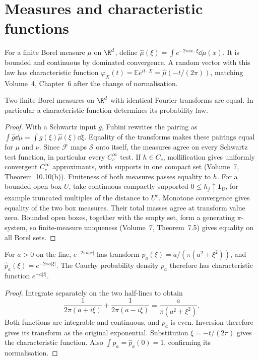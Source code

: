 \section{Measures and characteristic functions}

For a finite Borel measure $\mu$ on $\R^d$, define $\hat\mu(\xi)=\int e^{-2\pi ix\cdot\xi}\dd\mu(x)$. It is bounded and continuous by dominated convergence. A random vector with this law has characteristic function
$\varphi_X(t)=\mathbb E e^{it\cdot X}=\hat\mu(-t/(2\pi))$,
matching Volume~4, Chapter~6 after the change of normalisation.

\begin{theorem}\label{thm:measuniq}
Two finite Borel measures on $\R^d$ with identical Fourier transforms are equal. In particular a characteristic function determines its probability law.
\end{theorem}
\begin{proof}
With a Schwartz input $g$, Fubini rewrites the pairing as $\int\hat g\dd\mu=\int g(\xi)\hat\mu(\xi)\dd\xi$. Equality of the transforms makes these pairings equal for $\mu$ and $\nu$. Since $\mathcal F$ maps $\mathcal S$ onto itself, the measures agree on every Schwartz test function, in particular every $C_c^\infty$ test.
If $h\in C_c$, mollification gives uniformly convergent $C_c^\infty$ approximants, with supports in one compact set (Volume~7, Theorem~10.10(b)). Finiteness of both measures passes equality to $h$. For a bounded open box $U$, take continuous compactly supported $0\le h_j\uparrow\mathbf1_U$, for example truncated multiples of the distance to $U^c$. Monotone convergence gives equality of the two box measures. Their total masses agree at transform value zero. Bounded open boxes, together with the empty set, form a generating $\pi$-system, so finite-measure uniqueness (Volume~7, Theorem~7.5) gives equality on all Borel sets.
\end{proof}

\begin{proposition}\label{prop:cauchylaw}
For $a>0$ on the line, $e^{-2\pi a|x|}$ has transform $p_a(\xi)=a/(\pi(a^2+\xi^2))$, and $\hat p_a(\xi)=e^{-2\pi a|\xi|}$. The Cauchy probability density $p_a$ therefore has characteristic function $e^{-a|t|}$.
\end{proposition}
\begin{proof}
Integrate separately on the two half-lines to obtain
\[
\frac1{2\pi(a+i\xi)}+\frac1{2\pi(a-i\xi)}
=\frac a{\pi(a^2+\xi^2)}.
\]
Both functions are integrable and continuous, and $p_a$ is even. Inversion therefore gives its transform as the original exponential. Substitution $\xi=-t/(2\pi)$ gives the characteristic function. Also $\int p_a=\hat p_a(0)=1$, confirming its normalisation.
\end{proof}

